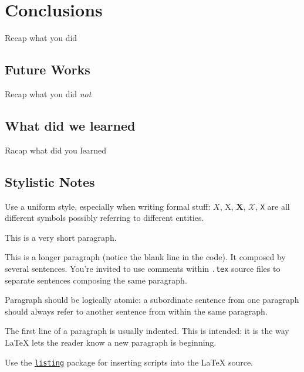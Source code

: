 \chapter{Conclusions}

	Recap what you did

\section{Future Works}

	Recap what you did \emph{not}

\section{What did we learned}

	Racap what did you learned

\section*{Stylistic Notes}
	Use a uniform style, especially when writing formal stuff: $X$, X, $\mathbf{X}$, $\mathcal{X}$, \texttt{X} are all different symbols possibly referring to different entities. 

	This is a very short paragraph.

	This is a longer paragraph (notice the blank line in the code).
	It composed by several sentences.
	You're invited to use comments within \texttt{.tex} source files to separate sentences composing the same paragraph.

	Paragraph should be logically atomic: a subordinate sentence from one paragraph should always refer to another sentence from within the same paragraph.

	The first line of a paragraph is usually indented.
	This is intended: it is the way \LaTeX{} lets the reader know a new paragraph is beginning.

	Use the \href{https://en.wikibooks.org/wiki/LaTeX/Source_Code_Listings}{\texttt{listing}} package for inserting scripts into the \LaTeX{} source.